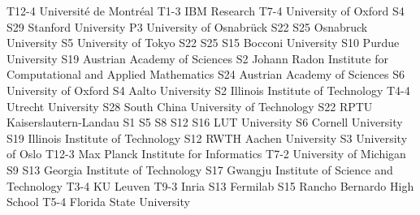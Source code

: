 \begin{multicols}{2}
{T12-4}
{}
{}
{}
{}
{}
{}
{Universit\'e de Montr\'eal}
{T1-3}
{}
{}
{}
{}
{}
{}
{IBM Research}
{T7-4}
{}
{}
{}
{}
{}
{}
{University of Oxford}
{S4}
{S29}
{}
{}
{}
{}
{}
{Stanford University}
{P3}
{}
{}
{}
{}
{}
{}
{University of Osnabr\"uck}
{S22}
{S25}
{}
{}
{}
{}
{}
{Osnabruck University}
{S5}
{}
{}
{}
{}
{}
{}
{University of Tokyo}
{S22}
{S25}
{S15}
{}
{}
{}
{}
{Bocconi University}
{S10}
{}
{}
{}
{}
{}
{}
{Purdue University}
{S19}
{}
{}
{}
{}
{}
{}
{Austrian Academy of Sciences}
{S2}
{}
{}
{}
{}
{}
{}
{Johann Radon Institute for Computational and Applied Mathematics}
{S24}
{}
{}
{}
{}
{}
{}
{Austrian Academy of Sciences}
{S6}
{}
{}
{}
{}
{}
{}
{University of Oxford}
{S4}
{}
{}
{}
{}
{}
{}
{Aalto University}
{S2}
{}
{}
{}
{}
{}
{}
{Illinois Institute of Technology}
{T4-4}
{}
{}
{}
{}
{}
{}
{Utrecht University}
{S28}
{}
{}
{}
{}
{}
{}
{South China University of Technology}
{S22}
{}
{}
{}
{}
{}
{}
{RPTU Kaiserslautern-Landau}
{S1}
{S5}
{S8}
{S12}
{S16}
{}
{}
{LUT University}
{S6}
{}
{}
{}
{}
{}
{}
{Cornell University}
{S19}
{}
{}
{}
{}
{}
{}
{Illinois Institute of Technology}
{S12}
{}
{}
{}
{}
{}
{}
{RWTH Aachen University}
{S3}
{}
{}
{}
{}
{}
{}
{University of Oslo}
{T12-3}
{}
{}
{}
{}
{}
{}
{Max Planck Institute for Informatics}
{T7-2}
{}
{}
{}
{}
{}
{}
{University of Michigan}
{S9}
{S13}
{}
{}
{}
{}
{}
{Georgia Institute of Technology}
{S17}
{}
{}
{}
{}
{}
{}
{Gwangju Institute of Science and Technology}
{T3-4}
{}
{}
{}
{}
{}
{}
{KU Leuven}
{T9-3}
{}
{}
{}
{}
{}
{}
{Inria}
{S13}
{}
{}
{}
{}
{}
{}
{Fermilab}
{S15}
{}
{}
{}
{}
{}
{}
{Rancho Bernardo High School}
{T5-4}
{}
{}
{}
{}
{}
{}
{Florida State University}

\end{multicols}
